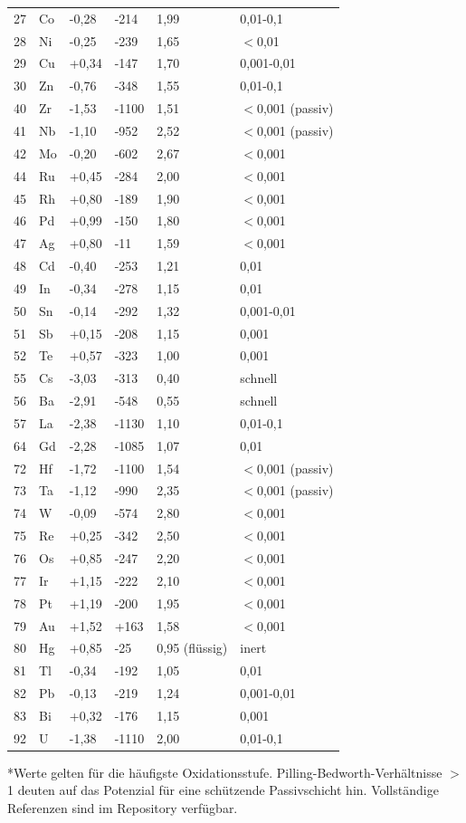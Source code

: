 \documentclass[12pt,a4paper]{article}
\begin{document}
\begin{longtable}{p{0.8cm}p{1.2cm}p{2.5cm}p{2.5cm}p{2.5cm}p{2.5cm}}
		27 & Co & -0,28 & -214 & 1,99 & 0,01-0,1 \\
		28 & Ni & -0,25 & -239 & 1,65 & $<$0,01 \\
		29 & Cu & +0,34 & -147 & 1,70 & 0,001-0,01 \\
		30 & Zn & -0,76 & -348 & 1,55 & 0,01-0,1 \\
		40 & Zr & -1,53 & -1100 & 1,51 & $<$0,001 (passiv) \\
		41 & Nb & -1,10 & -952 & 2,52 & $<$0,001 (passiv) \\
		42 & Mo & -0,20 & -602 & 2,67 & $<$0,001 \\
		44 & Ru & +0,45 & -284 & 2,00 & $<$0,001 \\
		45 & Rh & +0,80 & -189 & 1,90 & $<$0,001 \\
		46 & Pd & +0,99 & -150 & 1,80 & $<$0,001 \\
		47 & Ag & +0,80 & -11 & 1,59 & $<$0,001 \\
		48 & Cd & -0,40 & -253 & 1,21 & 0,01 \\
		49 & In & -0,34 & -278 & 1,15 & 0,01 \\
		50 & Sn & -0,14 & -292 & 1,32 & 0,001-0,01 \\
		51 & Sb & +0,15 & -208 & 1,15 & 0,001 \\
		52 & Te & +0,57 & -323 & 1,00 & 0,001 \\
		55 & Cs & -3,03 & -313 & 0,40 & schnell \\
		56 & Ba & -2,91 & -548 & 0,55 & schnell \\
		57 & La & -2,38 & -1130 & 1,10 & 0,01-0,1 \\
		64 & Gd & -2,28 & -1085 & 1,07 & 0,01 \\
		72 & Hf & -1,72 & -1100 & 1,54 & $<$0,001 (passiv) \\
		73 & Ta & -1,12 & -990 & 2,35 & $<$0,001 (passiv) \\
		74 & W  & -0,09 & -574 & 2,80 & $<$0,001 \\
		75 & Re & +0,25 & -342 & 2,50 & $<$0,001 \\
		76 & Os & +0,85 & -247 & 2,20 & $<$0,001 \\
		77 & Ir & +1,15 & -222 & 2,10 & $<$0,001 \\
		78 & Pt & +1,19 & -200 & 1,95 & $<$0,001 \\
		79 & Au & +1,52 & +163 & 1,58 & $<$0,001 \\
		80 & Hg & +0,85 & -25 & 0,95 (flüssig) & inert \\
		81 & Tl & -0,34 & -192 & 1,05 & 0,01 \\
		82 & Pb & -0,13 & -219 & 1,24 & 0,001-0,01 \\
		83 & Bi & +0,32 & -176 & 1,15 & 0,001 \\
		92 & U  & -1,38 & -1110 & 2,00 & 0,01-0,1 \\
		\bottomrule
	\end{longtable}
	*Werte gelten für die häufigste Oxidationsstufe. Pilling-Bedworth-Verhältnisse $>$ 1 deuten auf das Potenzial für eine schützende Passivschicht hin. Vollständige Referenzen sind im Repository verfügbar.
	
\end{document}
